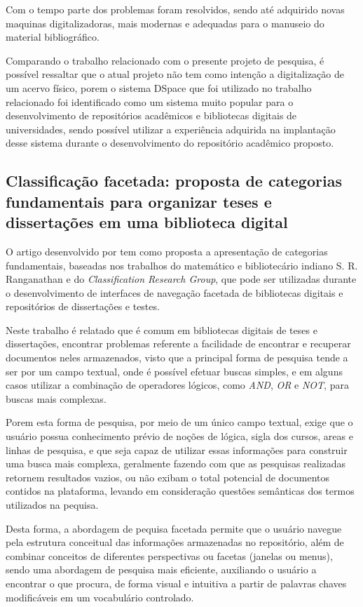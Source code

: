 Com o tempo parte dos problemas foram resolvidos, sendo até adquirido novas
maquinas digitalizadoras, mais modernas e adequadas para o manuseio do material
bibliográfico.

Comparando o trabalho relacionado com o presente projeto de pesquisa,
é possível ressaltar que o atual projeto não tem como intenção a digitalização
de um acervo físico, porem o sistema DSpace que foi utilizado no trabalho
relacionado foi identificado como um sistema muito popular para o desenvolvimento
de repositórios acadêmicos e bibliotecas digitais de universidades, sendo
possível utilizar a experiência adquirida na implantação desse sistema durante
o desenvolvimento do repositório acadêmico proposto.

\subsection{Classificação facetada: proposta de categorias fundamentais para organizar teses e dissertações em uma biblioteca digital}

O artigo desenvolvido por \cite{2021:Pereira} tem como
proposta a apresentação de categorias fundamentais, baseadas nos trabalhos
do matemático e bibliotecário indiano S. R. Ranganathan e do \emph{Classification Research Group}, que pode ser utilizadas
durante o desenvolvimento de interfaces de navegação facetada de bibliotecas
digitais e repositórios de dissertações e testes.

Neste trabalho é relatado que é comum em bibliotecas digitais de teses
e dissertações, encontrar problemas referente a facilidade de encontrar
e recuperar documentos neles armazenados, visto que a principal forma de
pesquisa tende a ser por um campo textual, onde é possível efetuar buscas
simples, e em alguns casos utilizar a combinação de operadores lógicos, como
\emph{AND}, \emph{OR} e \emph{NOT}, para buscas mais complexas.

Porem esta forma de pesquisa, por meio de um único campo textual,
exige que o usuário possua conhecimento prévio de noções de lógica,
sigla dos cursos, areas e linhas de pesquisa, e que seja capaz de
utilizar essas informações para construir uma busca mais complexa,
geralmente fazendo com que as pesquisas realizadas retornem resultados
vazios, ou não exibam o total potencial de documentos contidos na plataforma,
levando em consideração questões semânticas dos termos utilizados na pequisa.

Desta forma, a abordagem de pequisa facetada permite que o usuário navegue
pela estrutura conceitual das informações armazenadas no repositório, além de
combinar conceitos de diferentes perspectivas ou facetas (janelas ou menus), sendo uma abordagem
de pesquisa mais eficiente, auxiliando o usuário a encontrar o que procura,
de forma visual e intuitiva a partir de palavras chaves modificáveis em um
vocabulário controlado.

